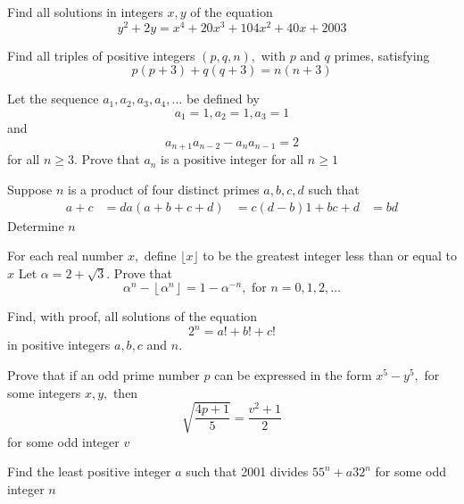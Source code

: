\documentclass{pset}
\begin{document}
\begin{problems}
\begin{problem}[IrMO 2003 Q8]
    Find all solutions in integers \(x, y\) of the equation
$$
y^{2}+2 y=x^{4}+20 x^{3}+104 x^{2}+40 x+2003
$$
\end{problem}

\begin{problem}[IrMO 2002 Q3]
    Find all triples of positive integers \((p, q, n),\) with \(p\) and \(q\) primes, satisfying
    $$
    p(p+3)+q(q+3)=n(n+3)
    $$
\end{problem}

\begin{problem}[IrMO 2002 Q4]
    Let the sequence \(a_{1}, a_{2}, a_{3}, a_{4}, \ldots\) be defined by
    $$
    a_{1}=1, a_{2}=1, a_{3}=1
    $$
    and
    $$
    a_{n+1} a_{n-2}-a_{n} a_{n-1}=2
    $$
    for all \(n \geq 3 .\) Prove that \(a_{n}\) is a positive integer for all \(n \geq 1\)
\end{problem}

\begin{problem}[IrMO 2002 Q7]
    Suppose \(n\) is a product of four distinct primes \(a, b, c, d\) such that
    \begin{align*}
    a+c&=d
    a(a+b+c+d)&=c(d-b)
    1+b c+d&=b d
    \end{align*}
    Determine \(n\)
\end{problem}

\begin{problem}[IrMO 2002 Q9]
    For each real number \(x,\) define \(\lfloor x\rfloor\) to be the greatest integer less than or equal to
    \(x\)
    Let \(\alpha=2+\sqrt{3} .\) Prove that
    $$
    \alpha^{n}-\left\lfloor\alpha^{n}\right\rfloor= 1-\alpha^{-n}, \text { for } n=0,1,2, \dots
    $$
\end{problem}

\begin{problem}[IrMO 2001 Q1]
    Find, with proof, all solutions of the equation
    $$
    2^{n}=a !+b !+c !
    $$
    in positive integers \(a, b, c\) and \(n .\)
\end{problem}

\begin{problem}[IrMO 2001 Q3]
    Prove that if an odd prime number \(p\) can be expressed in the form \(x^{5}-y^{5},\) for some integers \(x, y,\) then
    $$
    \sqrt{\frac{4 p+1}{5}}=\frac{v^{2}+1}{2}
    $$
    for some odd integer \(v\)
\end{problem}

\begin{problem}[IrMO 2001 Q6]
    Find the least positive integer \(a\) such that 2001 divides \(55^{n}+a 32^{n}\) for some odd integer \(n\)
\end{problem}


\end{problems}
\end{document}

